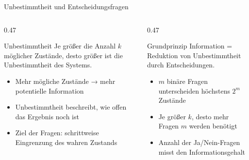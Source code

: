 \begin{frame}{Unbestimmtheit und Entscheidungsfragen}

\begin{columns}[t]
\begin{column}{0.47\textwidth}

\begin{blockDef}{Unbestimmtheit}
Je größer die Anzahl \(k\) möglicher Zustände, desto größer ist die
Unbestimmtheit des Systems.
\end{blockDef}

\begin{itemize}
  \item Mehr mögliche Zustände → mehr potentielle Information
  \item Unbestimmtheit beschreibt, wie offen das Ergebnis noch ist
  \item Ziel der Fragen: schrittweise Eingrenzung des wahren Zustands
\end{itemize}

\end{column}

\begin{column}{0.47\textwidth}

\begin{block}{Grundprinzip}
Information = Reduktion von Unbestimmtheit durch Entscheidungen.
\end{block}

\begin{itemize}
  \item \(m\) binäre Fragen unterscheiden höchstens \(2^m\) Zustände
  \item Je größer \(k\), desto mehr Fragen \(m\) werden benötigt
  \item Anzahl der Ja/Nein-Fragen misst den Informationsgehalt
\end{itemize}

\end{column}
\end{columns}
\end{frame}


